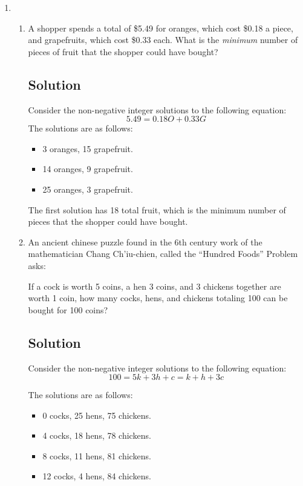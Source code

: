 \documentclass[12pt]{amsart}
\begin{document}
\begin{enumerate}
\item
\begin{enumerate}\setlength{\itemsep}{6pt}

\item A shopper spends a total of \$5.49 for oranges, which cost \$0.18 a piece, and grapefruits, which cost \$0.33 each. What is the {\it minimum} number of pieces of fruit that the shopper could have bought?

\subsection*{Solution}
Consider the non-negative integer solutions to the following equation:
%
\[ 5.49 = 0.18 O + 0.33 G \]
%
The solutions are as follows:
\bigskip
\begin{itemize}
\item 3 oranges, 15 grapefruit.
\item 14 oranges, 9 grapefruit.
\item 25 oranges, 3 grapefruit.
\end{itemize}

\bigskip

The first solution has 18 total fruit, which is the minimum number of pieces that the shopper could have bought.

\item An ancient chinese puzzle found in the 6th century work of the mathematician Chang Ch'iu-chien, called the ``Hundred Foods'' Problem asks:

If a cock is worth 5 coins, a hen 3 coins, and 3 chickens together are worth 1 coin, how many cocks, hens, and chickens totaling 100 can be bought for 100 coins?

\subsection*{Solution}
Consider the non-negative integer solutions to the following equation:
%
\[ 100 = 5k + 3h + c = k + h + 3c \]
%

\bigskip

The solutions are as follows:
\bigskip
\begin{itemize}
\item 0 cocks, 25 hens, 75 chickens.
\item 4 cocks, 18 hens, 78 chickens.
\item 8 cocks, 11 hens, 81 chickens.
\item 12 cocks, 4 hens, 84 chickens.
\end{itemize}


\end{enumerate}
\end{enumerate}
\end{document}
